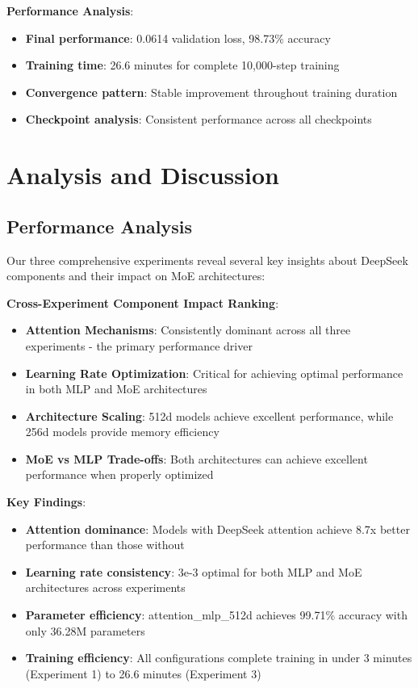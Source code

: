 \documentclass[11pt,a4paper]{article}
\begin{document}
\textbf{Performance Analysis}:
\begin{itemize}
    \item \textbf{Final performance}: 0.0614 validation loss, 98.73\% accuracy
    \item \textbf{Training time}: 26.6 minutes for complete 10,000-step training
    \item \textbf{Convergence pattern}: Stable improvement throughout training duration
    \item \textbf{Checkpoint analysis}: Consistent performance across all checkpoints
\end{itemize}


\section{Analysis and Discussion}

\subsection{Performance Analysis}

Our three comprehensive experiments reveal several key insights about DeepSeek components and their impact on MoE architectures:

\textbf{Cross-Experiment Component Impact Ranking}:
\begin{itemize}
    \item \textbf{Attention Mechanisms}: Consistently dominant across all three experiments - the primary performance driver
    \item \textbf{Learning Rate Optimization}: Critical for achieving optimal performance in both MLP and MoE architectures
    \item \textbf{Architecture Scaling}: 512d models achieve excellent performance, while 256d models provide memory efficiency
    \item \textbf{MoE vs MLP Trade-offs}: Both architectures can achieve excellent performance when properly optimized
\end{itemize}

\textbf{Key Findings}:
\begin{itemize}
    \item \textbf{Attention dominance}: Models with DeepSeek attention achieve 8.7x better performance than those without
    \item \textbf{Learning rate consistency}: 3e-3 optimal for both MLP and MoE architectures across experiments
    \item \textbf{Parameter efficiency}: attention\_mlp\_512d achieves 99.71\% accuracy with only 36.28M parameters
    \item \textbf{Training efficiency}: All configurations complete training in under 3 minutes (Experiment 1) to 26.6 minutes (Experiment 3)
\end{itemize}
\end{document}
